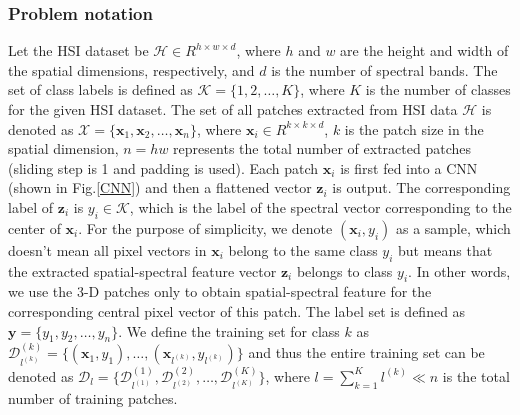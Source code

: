 \documentclass[journal]{IEEEtran}
\begin{document}
	\subsubsection{Problem notation} Let the HSI dataset be $\mathbf{\mathcal{H}}\in R^{h\times w\times d}$, where $h$ and $w$ are the height and width of the spatial dimensions, respectively, and $d$ is the number of spectral bands. The set of class labels is defined as $\mathcal{K}=\{1,2,\dots,K\}$, where $K$ is the number of classes for the given HSI dataset. The set of all patches extracted from HSI data $\mathbf{\mathcal{H}}$ is denoted as $\mathbf{\mathcal{X}}=\{\mathbf{x}_{1},\mathbf{x}_{2},\dots,\mathbf{x}_{n}\}$, where $\mathbf{x}_{i}\in R^{k\times k\times d}$, $k$ is the patch size in the spatial dimension, $n=hw$ represents the total number of extracted patches (sliding step is 1 and padding is used). {{Each patch $\mathbf{x}_{i}$ is first fed into a CNN (shown in Fig.\ref{CNN}) and then a flattened vector $\mathbf{z}_{i}$ is output. The corresponding label of $\mathbf{z}_{i}$ is $y_i\in \mathcal{K}$, which is the label of the spectral vector corresponding to the center of $\mathbf{x}_{i}$.
 For the purpose of simplicity, we denote $(\mathbf{x}_i,y_i)$ as a sample, which doesn't mean all pixel vectors in $\mathbf{x}_i$ belong to the same class $y_{i}$ but means that the extracted spatial-spectral feature vector $\mathbf{z}_{i}$ belongs to class $y_i$. In other words, we use the 3-D patches only to obtain spatial-spectral feature for the corresponding central pixel vector of this patch.}} The label set is defined as $\mathbf{y}=\{y_1,y_2,\dots,y_n\}$. We define the training set for class $k$ as $\mathbf{\mathcal{D}}^{(k)}_{l^{(k)}}=\{(\mathbf{x}_1,y_1),\dots,(\mathbf{x}_{l^{(k)}},y_{l^{(k)}})\}$ and thus the entire training set can be denoted as $\mathbf{\mathcal{D}}_{l}=\{\mathbf{\mathcal{D}}^{(1)}_{l^{(1)}},\mathbf{\mathcal{D}}^{(2)}_{l^{(2)}},\dots,\mathbf{\mathcal{D}}^{(K)}_{l^{(K)}}\}$, where $l=\sum_{k=1}^{K}l^{(k)} \ll n$ is the total number of training patches.
	
\end{document}
